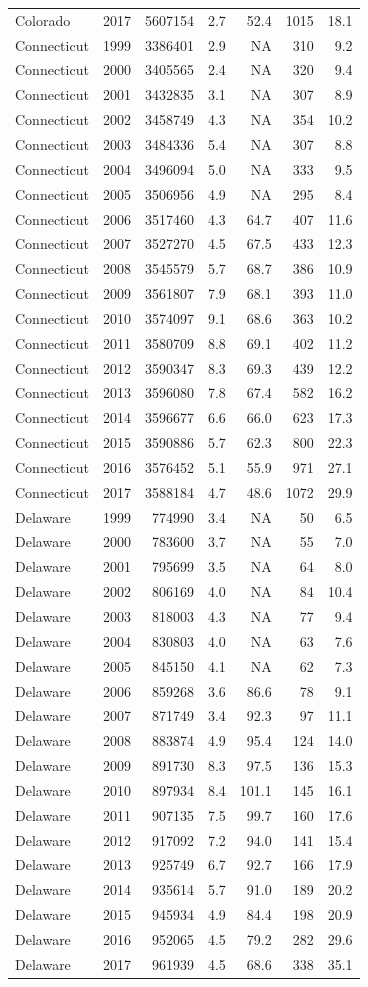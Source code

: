 \documentclass[
]{article}
\begin{document}
\begin{longtable}[]{@{}lrrrrrr@{}}
Colorado & 2017 & 5607154 & 2.7 & 52.4 & 1015 & 18.1\tabularnewline
Connecticut & 1999 & 3386401 & 2.9 & NA & 310 & 9.2\tabularnewline
Connecticut & 2000 & 3405565 & 2.4 & NA & 320 & 9.4\tabularnewline
Connecticut & 2001 & 3432835 & 3.1 & NA & 307 & 8.9\tabularnewline
Connecticut & 2002 & 3458749 & 4.3 & NA & 354 & 10.2\tabularnewline
Connecticut & 2003 & 3484336 & 5.4 & NA & 307 & 8.8\tabularnewline
Connecticut & 2004 & 3496094 & 5.0 & NA & 333 & 9.5\tabularnewline
Connecticut & 2005 & 3506956 & 4.9 & NA & 295 & 8.4\tabularnewline
Connecticut & 2006 & 3517460 & 4.3 & 64.7 & 407 & 11.6\tabularnewline
Connecticut & 2007 & 3527270 & 4.5 & 67.5 & 433 & 12.3\tabularnewline
Connecticut & 2008 & 3545579 & 5.7 & 68.7 & 386 & 10.9\tabularnewline
Connecticut & 2009 & 3561807 & 7.9 & 68.1 & 393 & 11.0\tabularnewline
Connecticut & 2010 & 3574097 & 9.1 & 68.6 & 363 & 10.2\tabularnewline
Connecticut & 2011 & 3580709 & 8.8 & 69.1 & 402 & 11.2\tabularnewline
Connecticut & 2012 & 3590347 & 8.3 & 69.3 & 439 & 12.2\tabularnewline
Connecticut & 2013 & 3596080 & 7.8 & 67.4 & 582 & 16.2\tabularnewline
Connecticut & 2014 & 3596677 & 6.6 & 66.0 & 623 & 17.3\tabularnewline
Connecticut & 2015 & 3590886 & 5.7 & 62.3 & 800 & 22.3\tabularnewline
Connecticut & 2016 & 3576452 & 5.1 & 55.9 & 971 & 27.1\tabularnewline
Connecticut & 2017 & 3588184 & 4.7 & 48.6 & 1072 & 29.9\tabularnewline
Delaware & 1999 & 774990 & 3.4 & NA & 50 & 6.5\tabularnewline
Delaware & 2000 & 783600 & 3.7 & NA & 55 & 7.0\tabularnewline
Delaware & 2001 & 795699 & 3.5 & NA & 64 & 8.0\tabularnewline
Delaware & 2002 & 806169 & 4.0 & NA & 84 & 10.4\tabularnewline
Delaware & 2003 & 818003 & 4.3 & NA & 77 & 9.4\tabularnewline
Delaware & 2004 & 830803 & 4.0 & NA & 63 & 7.6\tabularnewline
Delaware & 2005 & 845150 & 4.1 & NA & 62 & 7.3\tabularnewline
Delaware & 2006 & 859268 & 3.6 & 86.6 & 78 & 9.1\tabularnewline
Delaware & 2007 & 871749 & 3.4 & 92.3 & 97 & 11.1\tabularnewline
Delaware & 2008 & 883874 & 4.9 & 95.4 & 124 & 14.0\tabularnewline
Delaware & 2009 & 891730 & 8.3 & 97.5 & 136 & 15.3\tabularnewline
Delaware & 2010 & 897934 & 8.4 & 101.1 & 145 & 16.1\tabularnewline
Delaware & 2011 & 907135 & 7.5 & 99.7 & 160 & 17.6\tabularnewline
Delaware & 2012 & 917092 & 7.2 & 94.0 & 141 & 15.4\tabularnewline
Delaware & 2013 & 925749 & 6.7 & 92.7 & 166 & 17.9\tabularnewline
Delaware & 2014 & 935614 & 5.7 & 91.0 & 189 & 20.2\tabularnewline
Delaware & 2015 & 945934 & 4.9 & 84.4 & 198 & 20.9\tabularnewline
Delaware & 2016 & 952065 & 4.5 & 79.2 & 282 & 29.6\tabularnewline
Delaware & 2017 & 961939 & 4.5 & 68.6 & 338 & 35.1\tabularnewline

\end{longtable}
\end{document}
